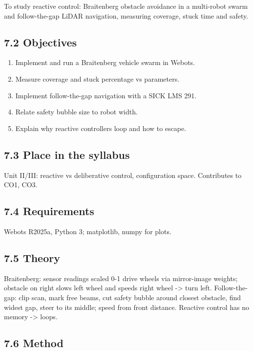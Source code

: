 \documentclass[
]{article}
\providecommand{\tightlist}{%
  \setlength{\itemsep}{0pt}\setlength{\parskip}{0pt}}
\begin{document}
To study reactive control: Braitenberg obstacle avoidance in a
multi-robot swarm and follow-the-gap LiDAR navigation, measuring
coverage, stuck time and safety.

\subsection{7.2 Objectives}\label{objectives-6}

\begin{enumerate}
\def\labelenumi{\arabic{enumi}.}
\tightlist
\item
  Implement and run a Braitenberg vehicle swarm in Webots.
\item
  Measure coverage and stuck percentage vs parameters.
\item
  Implement follow-the-gap navigation with a SICK LMS 291.
\item
  Relate safety bubble size to robot width.
\item
  Explain why reactive controllers loop and how to escape.
\end{enumerate}

\subsection{7.3 Place in the syllabus}\label{place-in-the-syllabus-6}

Unit II/III: reactive vs deliberative control, configuration space.
Contributes to CO1, CO3.

\subsection{7.4 Requirements}\label{requirements-6}

Webots R2025a, Python 3; matplotlib, numpy for plots.

\subsection{7.5 Theory}\label{theory-6}

Braitenberg: sensor readings scaled 0-1 drive wheels via mirror-image
weights; obstacle on right slows left wheel and speeds right wheel
-\textgreater{} turn left. Follow-the-gap: clip scan, mark free beams,
cut safety bubble around closest obstacle, find widest gap, steer to its
middle; speed from front distance. Reactive control has no memory
-\textgreater{} loops.

\subsection{7.6 Method}\label{method-6}
\end{document}
